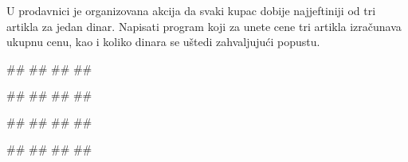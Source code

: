 \begin{Exercise}[label=v1.2_06] 
U prodavnici je organizovana akcija da svaki kupac dobije najjeftiniji od tri artikla za jedan dinar. Napisati program koji za unete cene tri artikla izračunava ukupnu cenu, kao i koliko dinara se uštedi zahvaljujući popustu. 

\begin{miditest}
\begin{upotreba}{1}
#\naslovInt#
##
##
##
\end{upotreba}
\end{miditest}
\begin{miditest}
\begin{upotreba}{2}
#\naslovInt#
##
##
##
\end{upotreba}
\end{miditest}

\begin{miditest}
\begin{upotreba}{3}
#\naslovInt#
##
##
##
\end{upotreba}
\end{miditest}
\begin{miditest}
\begin{upotreba}{4}
#\naslovInt#
##
##
##
\end{upotreba}
\end{miditest}

\end{Exercise}
\ifresenja
 \begin{Answer}[ref=v1.2_06]
\end{Answer}
\fi


